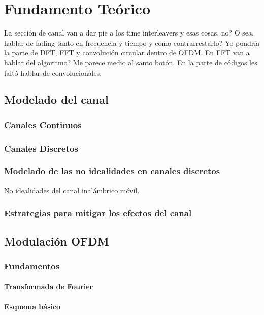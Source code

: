 \chapter{Fundamento Teórico}

La sección de canal van a dar pie a los time interleavers y esas cosas, no? O sea, hablar de fading tanto en frecuencia y tiempo y cómo contrarrestarlo?
Yo pondría la parte de DFT, FFT y convolución circular dentro de OFDM. En FFT van a hablar del algoritmo? Me parece medio al santo botón.
En la parte de códigos les faltó hablar de convolucionales.


\section{Modelado del canal}
\subsection{Canales Continuos}
\subsection{Canales Discretos}
\subsection{Modelado de las no idealidades en canales discretos}
No idealidades del canal inalámbrico móvil.
\subsection{Estrategias para mitigar los efectos del canal}


\section{Modulación OFDM}

\subsection{Fundamentos}

\subsubsection{Transformada de Fourier}

\subsubsection{Esquema b\'asico}

